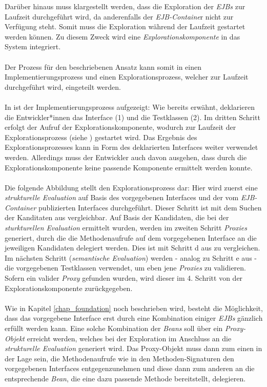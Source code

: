Darüber hinaus muss klargestellt werden, dass die Exploration der \emph{EJBs} zur Laufzeit durchgeführt wird, da anderenfalls der \emph{EJB-Containe}r nicht zur Verfügung steht. Somit muss die Exploration während der Laufzeit gestartet werden können. Zu diesem Zweck wird eine \emph{Explorationskomponente} in das System integriert. 
\\\\
Der Prozess für den beschriebenen Ansatz kann somit in einen Implementierungsprozess und einen Explorationsprozess, welcher zur Laufzeit durchgeführt wird, eingeteilt werden.
\\\\
In  ist der Implementierungsprozess aufgezeigt:
\noindent
Wie bereits erwähnt, deklarieren die Entwickler*innen das Interface (1) und die Testklassen (2). Im dritten Schritt erfolgt der Aufruf der Explorationskomponente, wodurch zur Laufzeit der Explorationsprozess (siehe ) gestartet wird. Das Ergebnis des Explorationsprozesses kann in Form des deklarierten Interfaces weiter verwendet werden. Allerdings muss der Entwickler auch davon ausgehen, dass durch die Explorationskomponente keine passende Komponente ermittelt werden konnte.
\\\\
Die folgende Abbildung stellt den Explorationsprozess dar:
\noindent
Hier wird zuerst eine \emph{strukturelle Evaluation} auf Basis des vorgegebenen Interfaces und der vom \emph{EJB-Container} publizierten Interfaces durchgeführt. 
Dieser Schritt ist mit dem Suchen der Kanditaten aus  vergleichbar. Auf Basis der Kandidaten, die bei der \emph{sturkturellen Evaluation} ermittelt wurden, werden im zweiten Schritt \emph{Proxies} generiert, durch die die Methodenaufrufe auf dem vorgegebenen Interface an die jeweiligen Kandidaten delegiert werden. Dies ist mit Schritt d aus  zu vergleichen. Im nächsten Schritt (\emph{semantische Evaluation}) werden - analog zu Schritt e aus  - die vorgegebenen Testklassen verwendet, um eben jene \emph{Proxies} zu validieren. Sofern ein valider \emph{Proxy} gefunden wurden, wird dieser im 4. Schritt von der Explorationskomponente zurückgegeben.
\\\\
Wie in Kapitel \ref{chap_foundation} noch beschrieben wird, besteht die Möglichkeit, dass das vorgegebene Interface erst durch eine Kombination einiger \emph{EJBs} gänzlich erfüllt werden kann. Eine solche Kombination der \emph{Beans} soll über ein \emph{Proxy-Objekt} erreicht werden, welches bei der Exploration im Anschluss an die \emph{strukturelle Evaluation} generiert wird. Das Proxy-Objekt muss dann zum einen in der Lage sein, die Methodenaufrufe wie in den Methoden-Signaturen den vorgegebenen Interfaces entgegenzunehmen und diese dann zum anderen an die entsprechende \emph{Bean}, die eine dazu passende Methode bereitstellt, delegieren.
